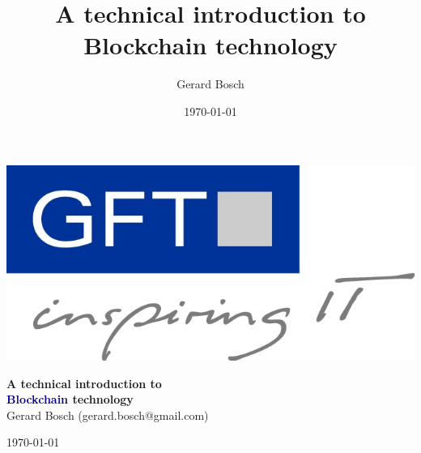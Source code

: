 \documentclass[notitlepage, usenames,dvipsnames]{beamer}
\title[Intro to Blockchain Technology]{A technical introduction to Blockchain technology}
\author[Gerard Bosch]{Gerard Bosch}
\institute{\email{gerard.bosch@gmail.com}}
\date{\today}
\begin{document}

    \begin{frame}
        \begin{center}
            
            
            \includegraphics[scale=0.15]{../img/gft.jpg}

            \vspace{1em}
            {\huge \bfseries \textcolor{MidnightBlue!100!bg}{ A technical introduction to\\[3mm] \textcolor{DarkBlue}{Blockchain} technology }} \\[3mm]


            \vspace{1cm}
            Gerard Bosch (gerard.bosch@gmail.com)

            \vspace{0.8cm}\today
        \end{center}
    \end{frame}



\end{document}
